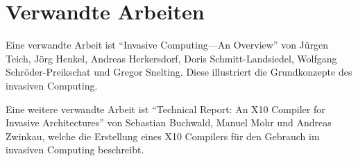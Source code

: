 \section{Verwandte Arbeiten}

Eine verwandte Arbeit ist "`Invasive Computing—An Overview"'\cite{invasiveOverview}
von Jürgen Teich, Jörg Henkel, Andreas Herkersdorf, Doris Schmitt-Landsiedel, Wolfgang Schröder-Preikschat
und Gregor Snelting. Diese illustriert die Grundkonzepte des invasiven Computing.

Eine weitere verwandte Arbeit ist "`Technical Report: An X10 Compiler for Invasive Architectures"'\cite{invasiveX10} 
von Sebastian Buchwald, Manuel Mohr und Andreas Zwinkau, welche die Erstellung eines X10 Compilers für den Gebrauch 
im invasiven Computing beschreibt.
